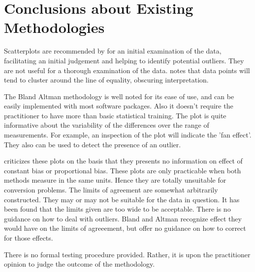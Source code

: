 \documentclass[Main.tex]{subfiles}
\begin{document}
	



	
	





\section{Conclusions about Existing Methodologies}

Scatterplots are recommended by \citet{BA83} for an initial
examination of the data, facilitating an initial judgement and helping to identify potential outliers. They are not useful for a thorough examination of the data. \citet{BritHypSoc} notes that data points will tend to cluster around the line of equality, obscuring interpretation.


The Bland Altman methodology is well noted for its ease of use, and can be easily implemented with most software packages. Also it
doesn't require the practitioner to have more than basic statistical training. The plot is quite informative about the variability of the differences over the range of measurements. For example, an inspection of the plot will indicate the 'fan effect'. They also can be used to detect the presence of an outlier.

\citet{ludbrook97,ludbrook02} criticizes these plots on the
basis that they presents no information on effect of constant bias
or proportional bias. These plots are only practicable when both methods measure in the same units. Hence they are totally
unsuitable for conversion problems. The limits of agreement are somewhat arbitrarily constructed. They may or may not be suitable
for the data in question. It has been found that the limits given are too wide to be acceptable. There is no guidance on how to deal
with outliers. Bland and Altman recognize effect they would have on the limits of agreeement, but offer no guidance on how to correct for those effects.

There is no formal testing procedure provided. Rather, it is upon
the practitioner opinion to judge the outcome of the methodology.





\end{document}
